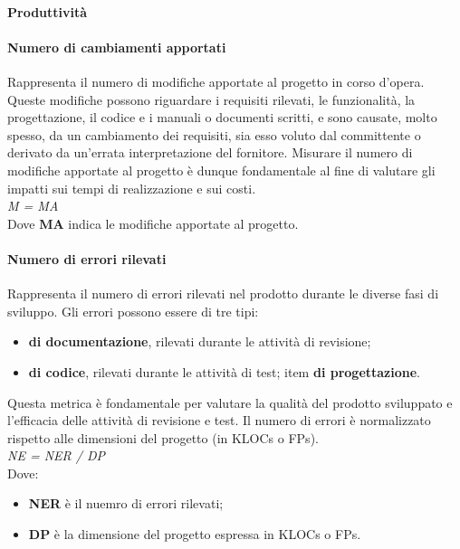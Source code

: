 \paragraph{Produttivit\`a}

\paragraph{Numero di cambiamenti apportati}
Rappresenta il numero di modifiche apportate al progetto in corso d'opera. Queste modifiche possono riguardare i requisiti rilevati, le funzionalit\`a, la progettazione, il codice e i manuali o documenti scritti, e sono causate, molto spesso, da un cambiamento dei requisiti, sia esso voluto dal committente o derivato da un'errata interpretazione del fornitore. Misurare il numero di modifiche apportate al progetto \`e dunque fondamentale al fine di valutare gli impatti sui tempi di realizzazione e sui costi.\\
\textit{M = MA}\\
Dove \textbf{MA} indica le modifiche apportate al progetto.

\paragraph{Numero di errori rilevati}
Rappresenta il numero di errori rilevati nel prodotto durante le diverse fasi di sviluppo. Gli errori possono essere di tre tipi:
\begin{itemize}
	\item \textbf{di documentazione}, rilevati durante le attivit\`a di revisione;
	\item \textbf{di codice}, rilevati durante le attivit\`a di test;
		item \textbf{di progettazione}.
\end{itemize}
Questa metrica \`e fondamentale per valutare la qualit\`a del prodotto sviluppato e l'efficacia delle attivit\`a di revisione e test. Il numero di errori \`e normalizzato rispetto alle dimensioni del progetto (in KLOCs o FPs).\\
\textit{NE = NER / DP} \\
Dove:
\begin{itemize}
	\item \textbf{NER} \`e il nuemro di errori rilevati;
	\item \textbf{DP} \`e la dimensione del progetto espressa in KLOCs o FPs.
\end{itemize}